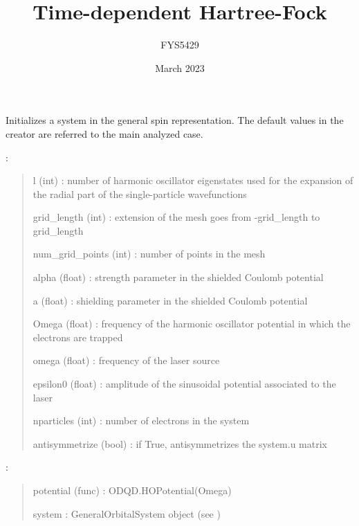 \documentclass[letterpaper,10pt,english]{sphinxmanual}
\title{Time-dependent Hartree-Fock}
\date{March 2023}
\author{FYS5429}
\begin{document}
\pagestyle{empty}
\sphinxmaketitle
\pagestyle{plain}
\sphinxtableofcontents
\pagestyle{normal}
\label{\detokenize{index::doc}}


\begin{fulllineitems}
\label{\detokenize{index:do.GHF}}
Initializes a system in the general spin representation. The default values in the creator are referred to the main analyzed case.

:
\begin{quote}

l (int) : number of harmonic oscillator eigenstates used for the expansion of the radial part of the single-particle wavefunctions

grid\_length (int) : extension of the mesh goes from -grid\_length to grid\_length

num\_grid\_points (int) : number of points in the mesh

alpha (float) : strength parameter in the shielded Coulomb potential

a (float) : shielding parameter in the shielded Coulomb potential

Omega (float) : frequency of the harmonic oscillator potential in which the electrons are trapped

omega (float) : frequency of the laser source

epsilon0 (float) : amplitude of the sinusoidal potential associated to the laser

nparticles (int) : number of electrons in the system

antisymmetrize (bool) : if True, antisymmetrizes the system.u matrix
\end{quote}

:
\begin{quote}

potential (func) : ODQD.HOPotential(Omega)

system : GeneralOrbitalSystem object (see )


\end{quote}
\end{fulllineitems}
\end{document}
